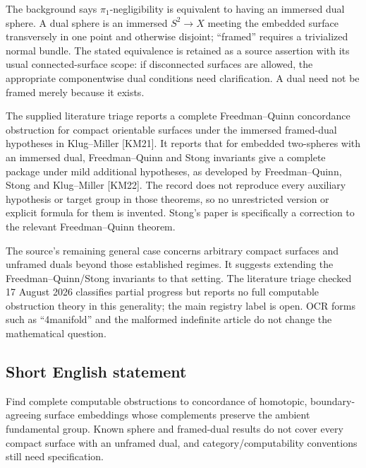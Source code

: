 \documentclass[11pt]{article}
\begin{document}
The background says $\pi_1$-negligibility is equivalent to having an immersed dual sphere. A dual sphere is an immersed $S^2\to X$ meeting the embedded surface transversely in one point and otherwise disjoint; ``framed'' requires a trivialized normal bundle. The stated equivalence is retained as a source assertion with its usual connected-surface scope: if disconnected surfaces are allowed, the appropriate componentwise dual conditions need clarification. A dual need not be framed merely because it exists.

The supplied literature triage reports a complete Freedman--Quinn concordance obstruction for compact orientable surfaces under the immersed framed-dual hypotheses in Klug--Miller [KM21]. It reports that for embedded two-spheres with an immersed dual, Freedman--Quinn and Stong invariants give a complete package under mild additional hypotheses, as developed by Freedman--Quinn, Stong and Klug--Miller [KM22]. The record does not reproduce every auxiliary hypothesis or target group in those theorems, so no unrestricted version or explicit formula for them is invented. Stong's paper is specifically a correction to the relevant Freedman--Quinn theorem.

The source's remaining general case concerns arbitrary compact surfaces and unframed duals beyond those established regimes. It suggests extending the Freedman--Quinn/Stong invariants to that setting. The literature triage checked 17 August 2026 classifies partial progress but reports no full computable obstruction theory in this generality; the main registry label is open. OCR forms such as ``4manifold'' and the malformed indefinite article do not change the mathematical question.
\subsection{Short English statement}
Find complete computable obstructions to concordance of homotopic, boundary-agreeing surface embeddings whose complements preserve the ambient fundamental group. Known sphere and framed-dual results do not cover every compact surface with an unframed dual, and category/computability conventions still need specification.
\end{document}
